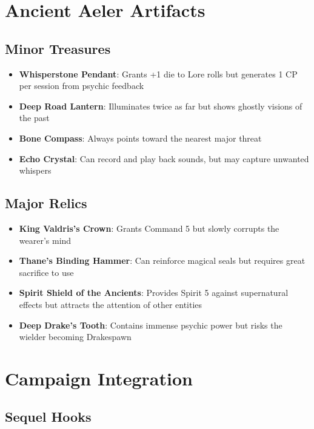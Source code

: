 \documentclass[11pt]{article}
\begin{document}
\section{Ancient Aeler Artifacts}

\subsection{Minor Treasures}

\begin{itemize}
\item \textbf{Whisperstone Pendant}: Grants +1 die to Lore rolls but generates 1 CP per session from psychic feedback
\item \textbf{Deep Road Lantern}: Illuminates twice as far but shows ghostly visions of the past
\item \textbf{Bone Compass}: Always points toward the nearest major threat
\item \textbf{Echo Crystal}: Can record and play back sounds, but may capture unwanted whispers
\end{itemize}

\subsection{Major Relics}

\begin{itemize}
\item \textbf{King Valdris's Crown}: Grants Command 5 but slowly corrupts the wearer's mind
\item \textbf{Thane's Binding Hammer}: Can reinforce magical seals but requires great sacrifice to use
\item \textbf{Spirit Shield of the Ancients}: Provides Spirit 5 against supernatural effects but attracts the attention of other entities
\item \textbf{Deep Drake's Tooth}: Contains immense psychic power but risks the wielder becoming Drakespawn
\end{itemize}

\section{Campaign Integration}

\subsection{Sequel Hooks}
\end{document}
